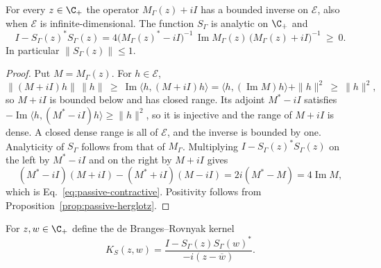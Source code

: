 \begin{proposition}
\label{prop:passive-cayley}
For every $z\in\C_+$ the operator $M_\Gamma(z)+iI$ has a bounded inverse on $\mathcal E$, also when $\mathcal E$ is infinite-dimensional. The function $S_\Gamma$ is analytic on $\C_+$ and
\begin{equation}
 I-S_\Gamma(z)^*S_\Gamma(z)
  =4\bigl(M_\Gamma(z)^*-iI\bigr)^{-1}\,\operatorname{Im}M_\Gamma(z)\,\bigl(M_\Gamma(z)+iI\bigr)^{-1}\ \geq\ 0 .
 \label{eq:passive-contractive}
\end{equation}
In particular $\|S_\Gamma(z)\|\le1$.
\end{proposition}
\begin{proof}
Put $M=M_\Gamma(z)$. For $h\in\mathcal E$,
\[
 \|(M+iI)h\|\,\|h\|\ \ge\ \operatorname{Im}\langle h,(M+iI)h\rangle
   =\langle h,(\operatorname{Im}M)h\rangle+\|h\|^2\ \ge\ \|h\|^2 ,
\]
so $M+iI$ is bounded below and has closed range. Its adjoint $M^*-iI$ satisfies $-\operatorname{Im}\langle h,(M^*-iI)h\rangle\ge\|h\|^2$, so it is injective and the range of $M+iI$ is dense. A closed dense range is all of $\mathcal E$, and the inverse is bounded by one. Analyticity of $S_\Gamma$ follows from that of $M_\Gamma$. Multiplying $I-S_\Gamma(z)^*S_\Gamma(z)$ on the left by $M^*-iI$ and on the right by $M+iI$ gives
\[
 (M^*-iI)(M+iI)-(M^*+iI)(M-iI)=2i(M^*-M)=4\operatorname{Im}M ,
\]
which is Eq.~\eqref{eq:passive-contractive}. Positivity follows from Proposition~\ref{prop:passive-herglotz}.
\end{proof}

For $z,w\in\C_+$ define the de Branges--Rovnyak kernel
\begin{equation}
 K_S(z,w)=\frac{I-S_\Gamma(z)S_\Gamma(w)^*}{-i(z-\overline w)} .
 \label{eq:passive-dbr-kernel}
\end{equation}

